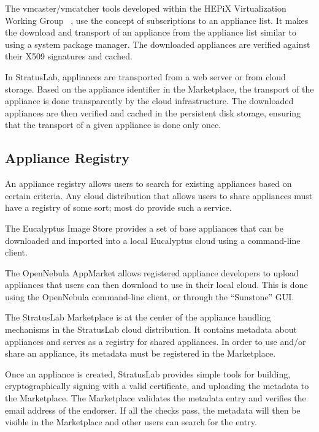 The vmcaster/vmcatcher tools developed within the HEPiX Virtualization
Working Group ~\cite{hepixbooktransfer}, use the concept of
subscriptions to an appliance list. It makes the download and
transport of an appliance from the appliance list similar to using a
system package manager.  The downloaded appliances are verified
against their X509 signatures and cached.

In StratusLab, appliances are transported from a web server or from
cloud storage. Based on the appliance identifier in the Marketplace,
the transport of the appliance is done transparently by the cloud
infrastructure.  The downloaded appliances are then verified and
cached in the persistent disk storage, ensuring that the transport of
a given appliance is done only once.

\subsection{Appliance Registry}

An appliance registry allows users to search for existing appliances
based on certain criteria.  Any cloud distribution that allows users
to share appliances must have a registry of some sort; most do provide
such a service.  

The Eucalyptus Image Store provides a set of base appliances that can
be downloaded and imported into a local Eucalyptus cloud using a
command-line client.

The OpenNebula AppMarket allows registered appliance developers to
upload appliances that users can then download to use in their local
cloud. This is done using the OpenNebula command-line client, or
through the ``Sunstone'' GUI.

The StratusLab Marketplace is at the center of the appliance handling
mechanisms in the StratusLab cloud distribution. It contains metadata
about appliances and serves as a registry for shared appliances.  In
order to use and/or share an appliance, its metadata must be
registered in the Marketplace\@.

Once an appliance is created, StratusLab provides simple tools for
building, cryptographically signing with a valid certificate, and
uploading the metadata to the Marketplace\@.  The Marketplace
validates the metadata entry and verifies the email address of the
endorser.  If all the checks pass, the metadata will then be visible
in the Marketplace and other users can search for the entry.
